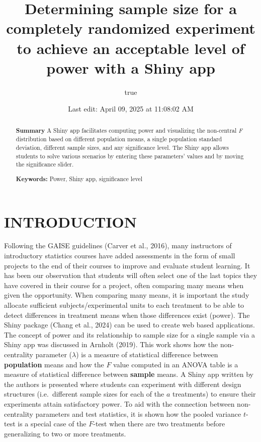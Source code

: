 \documentclass[
]{article}
\title{Determining sample size for a completely randomized experiment to achieve an acceptable level of power with a Shiny app}
\author{true}
\date{Last edit: April 09, 2025 at 11:08:02 AM}
\begin{document}
\maketitle
\begin{abstract}
\textbf{Summary} A Shiny app facilitates computing power and visualizing the non-central \emph{F} distribution based on different population means, a single population standard deviation, different sample sizes, and any significance level. The Shiny app allows students to solve various scenarios by entering these parameters' values and by moving the significance slider.

\textbf{Keywords:} Power, Shiny app, significance level
\end{abstract}

\hypertarget{introduction}{%
\section*{INTRODUCTION}\label{introduction}}

Following the GAISE guidelines (Carver et al., 2016), many instructors of introductory statistics courses have added assessments in the form of small projects to the end of their courses to improve and evaluate student learning. It has been our observation that students will often select one of the last topics they have covered in their course for a project, often comparing many means when given the opportunity. When comparing many means, it is important the study allocate sufficient subjects/experimental units to each treatment to be able to detect differences in treatment means when those differences exist (power). The Shiny package (Chang et al., 2024) can be used to create web based applications. The concept of power and its relationship to sample size for a single sample via a Shiny app was discussed in Arnholt (2019). This work shows how the non-centrality parameter (\(\lambda\)) is a measure of statistical difference between \textbf{population} means and how the \(F\) value computed in an ANOVA table is a measure of statistical difference between \textbf{sample} means. A Shiny app written by the authors is presented where students can experiment with different design structures (i.e.~different sample sizes for each of the \(a\) treatments) to ensure their experiments attain satisfactory power. To aid with the connection between non-centrality parameters and test statistics, it is shown how the pooled variance \(t\)-test is a special case of the \(F\)-test when there are two treatments before generalizing to two or more treatments.
\end{document}
